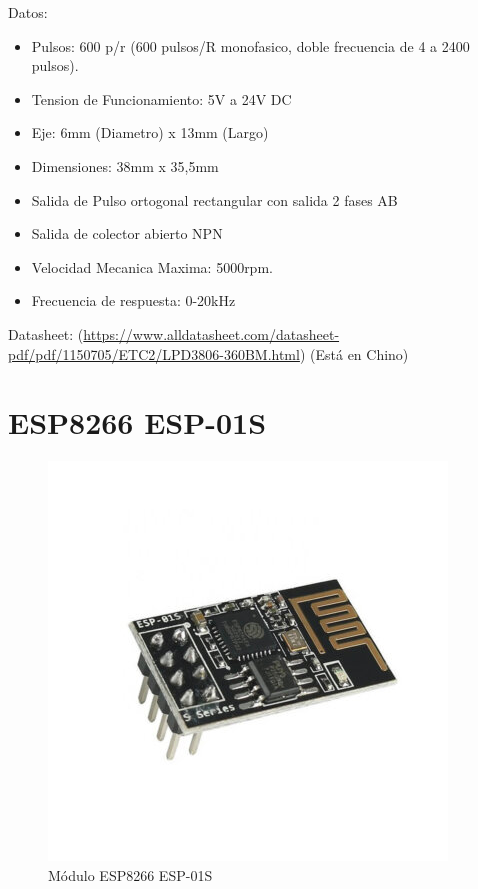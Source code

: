             Datos:\par
            
            \begin{itemize}[label=•]
                \setlength{\itemindent}{2em}
                
                \item Pulsos: 600 p/r (600 pulsos/R monofasico, doble frecuencia de 4 a 2400 pulsos).\par
                \item Tension de Funcionamiento: 5V a 24V DC
                \item Eje: 6mm (Diametro) x 13mm (Largo)\par
                \item Dimensiones: 38mm x 35,5mm\par
                \item Salida de Pulso ortogonal rectangular con salida 2 fases AB\par
                \item Salida de colector abierto NPN\par
                \item Velocidad Mecanica Maxima: 5000rpm.\par
                \item Frecuencia de respuesta: 0-20kHz\par
            \end{itemize}
            
            Datasheet: (\href{https://www.alldatasheet.com/datasheet-pdf/pdf/1150705/ETC2/LPD3806-360BM.html}{https://www.alldatasheet.com/datasheet-pdf/pdf/1150705/ETC2/LPD3806-360BM.html}) (Está en Chino)\par

    \newpage
    
    \section{ESP8266 ESP-01S}
    \label{esp8266}
        \begin{figure}[!ht]
            \centering
            \includegraphics[width=0.5\linewidth]{Imagenes/Anexo_C/ESP8266.png}
            \caption{Módulo ESP8266 ESP-01S}
            \label{fig:c4}
        \end{figure}
        
